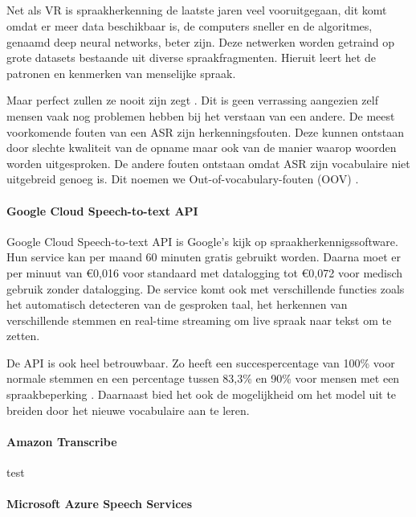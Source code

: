 \subsection{}%

Net als VR is spraakherkenning de laatste jaren veel vooruitgegaan, dit komt omdat er meer data beschikbaar is, de computers sneller en de algoritmes, genaamd deep neural networks, beter zijn. Deze netwerken worden getraind op grote datasets bestaande uit diverse spraakfragmenten. Hieruit leert het de patronen en kenmerken van menselijke spraak.

Maar perfect zullen ze nooit zijn zegt \textcite{Hessen2020}. Dit is geen verrassing aangezien zelf mensen vaak nog problemen hebben bij het verstaan van een andere. De meest voorkomende fouten van een ASR zijn herkenningsfouten. Deze kunnen ontstaan door slechte kwaliteit van de opname maar ook van de manier waarop woorden worden uitgesproken. De andere fouten ontstaan omdat ASR zijn vocabulaire niet uitgebreid genoeg is. Dit noemen we Out-of-vocabulary-fouten (OOV) \autocite{Hessen2020}.

\paragraph{Google Cloud Speech-to-text API}%

Google Cloud Speech-to-text API is Google's kijk op spraakherkennigssoftware. Hun service kan per maand 60 minuten gratis gebruikt worden. Daarna moet er per minuut van €0,016 voor standaard met datalogging tot €0,072 voor medisch gebruik zonder datalogging. De service komt ook met verschillende functies zoals het automatisch detecteren van de gesproken taal, het herkennen van verschillende stemmen en real-time streaming om live spraak naar tekst om te zetten.

De API is ook heel betrouwbaar. Zo heeft een succespercentage van 100\% voor normale stemmen en een percentage tussen 83,3\% en 90\% voor mensen met een spraakbeperking \autocite{Anggraini2018}. Daarnaast bied het ook de mogelijkheid om het model uit te breiden door het nieuwe vocabulaire aan te leren.


\paragraph{Amazon Transcribe}%

test

\paragraph{Microsoft Azure Speech Services}%

